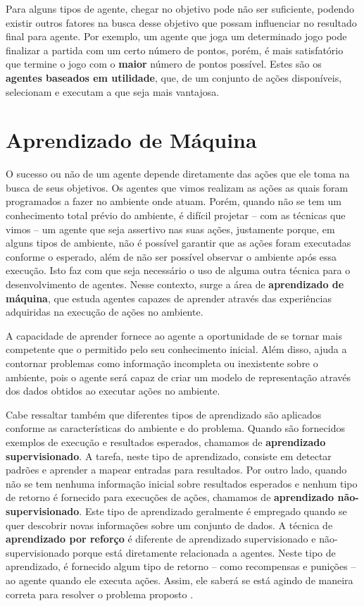 Para alguns tipos de agente, chegar no objetivo pode não ser suficiente, podendo
existir outros fatores na busca desse objetivo que possam influenciar no
resultado final para agente. Por exemplo, um agente que joga um determinado jogo
pode finalizar a partida com um certo número de pontos, porém, é mais
satisfatório que termine o jogo com o \textbf{maior} número de pontos possível.
Estes são os \textbf{agentes baseados em utilidade}, que, de um conjunto de
ações disponíveis, selecionam e executam a que seja mais vantajosa.


\section{\label{section:machine-learning}Aprendizado de Máquina}
O sucesso ou não de um agente depende diretamente das ações que ele toma na
busca de seus objetivos. Os agentes que vimos realizam as ações as quais foram
programados a fazer no ambiente onde atuam. Porém, quando não se tem um
conhecimento total prévio do ambiente, é difícil projetar -- com as técnicas
que vimos -- um agente que seja assertivo nas suas ações, justamente porque, em
alguns tipos de ambiente, não é possível garantir que as ações foram executadas
conforme o esperado, além de não ser possível observar o ambiente após essa
execução. Isto faz com que seja necessário o uso de alguma outra técnica para o
desenvolvimento de agentes. Nesse contexto, surge a área de \textbf{aprendizado
de máquina}, que estuda agentes capazes de aprender através das experiências
adquiridas na execução de ações no ambiente.

A capacidade de aprender fornece ao agente a oportunidade de se tornar mais
competente que o permitido pelo seu conhecimento inicial.  Além disso, ajuda a
contornar problemas como informação incompleta ou inexistente sobre o ambiente,
pois o agente será capaz de criar um modelo de representação através dos dados
obtidos ao executar ações no ambiente.

Cabe ressaltar também que diferentes tipos de aprendizado são aplicados
conforme as características do ambiente e do problema. Quando são fornecidos
exemplos de execução e resultados esperados, chamamos de \textbf{aprendizado
supervisionado}. A tarefa, neste tipo de aprendizado, consiste em detectar
padrões e aprender a mapear entradas para resultados. Por outro lado, quando
não se tem nenhuma informação inicial sobre resultados esperados e nenhum tipo
de retorno é fornecido para execuções de ações, chamamos de \textbf{aprendizado
não-supervisionado}. Este tipo de aprendizado geralmente é empregado quando se
quer descobrir novas informações sobre um conjunto de dados. A técnica de
\textbf{aprendizado por reforço} é diferente de aprendizado supervisionado e
não-supervisionado porque está diretamente relacionada a agentes. Neste tipo de
aprendizado, é fornecido algum tipo de retorno -- como recompensas e punições
-- ao agente quando ele executa ações.  Assim, ele saberá se está agindo de
maneira correta para resolver o problema proposto
\cite[cap. 18]{RussellNorvig200912}.

